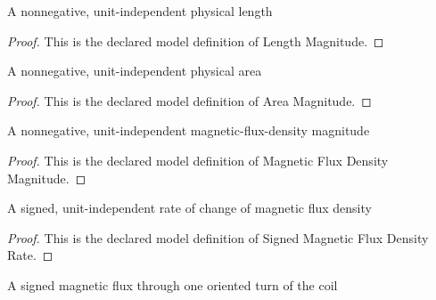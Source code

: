 \begin{definition}
  \label{def:physics:phyx-mini-0936:phyxminiproblems-problemphyxmini0936-lengthmagnitude}
  A nonnegative, unit-independent physical length
\end{definition}
\begin{proof}
  This is the declared model definition of Length Magnitude.
\end{proof}
\begin{definition}
  \label{def:physics:phyx-mini-0936:phyxminiproblems-problemphyxmini0936-areamagnitude}
  A nonnegative, unit-independent physical area
\end{definition}
\begin{proof}
  This is the declared model definition of Area Magnitude.
\end{proof}
\begin{definition}
  \label{def:physics:phyx-mini-0936:phyxminiproblems-problemphyxmini0936-magneticfluxdensitymagnitude}
  A nonnegative, unit-independent magnetic-flux-density magnitude
\end{definition}
\begin{proof}
  This is the declared model definition of Magnetic Flux Density Magnitude.
\end{proof}
\begin{definition}
  \label{def:physics:phyx-mini-0936:phyxminiproblems-problemphyxmini0936-signedmagneticfluxdensityrate}
  A signed, unit-independent rate of change of magnetic flux density
\end{definition}
\begin{proof}
  This is the declared model definition of Signed Magnetic Flux Density Rate.
\end{proof}
\begin{definition}
  \label{def:physics:phyx-mini-0936:phyxminiproblems-problemphyxmini0936-signedmagneticflux}
  A signed magnetic flux through one oriented turn of the coil
\end{definition}
